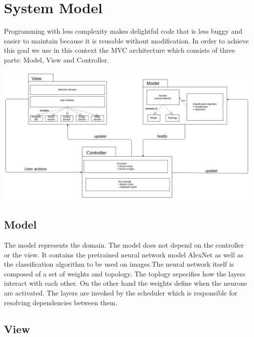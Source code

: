 \documentclass[parskip=full]{scrartcl}
\begin{document}
\pagebreak





\section{System Model}

Programming with less complexity makes delightful code that is less buggy and easier to maintain because it is reusable without modification. In order to achieve this goal we use in this context the MVC architecture which consists of three parts: Model, View and Controller.

\begin{center}
\includegraphics[width=1.0\textwidth]{images/MVC.png}
\end{center}

\subsection{Model}

The model represents the domain. The model does not depend on the controller or the view. It contains the pretrained neural network model AlexNet as well as the classification algorithm to be used on images.The neural network itself is composed of a set of weights and topology. The toplogy sepecifies how the layers interact with each other. On the other hand the weights define when the neurons are activated. The layers are invoked by the scheduler which is responsible for resolving dependencies between them.

\pagebreak



\subsection{View}
\end{document}
